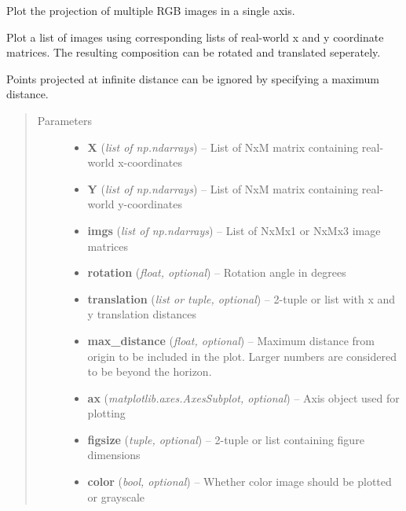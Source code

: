 \documentclass[letterpaper,10pt,english]{sphinxmanual}
\begin{document}
\begin{fulllineitems}
\label{flamingo/rectification/index:flamingo.rectification.plot.plot_rectified}
Plot the projection of multiple RGB images in a single axis.

Plot a list of images using corresponding lists of real-world
x and y coordinate matrices. The resulting composition can be
rotated and translated seperately.

Points projected at infinite distance can be ignored by
specifying a maximum distance.
\begin{quote}\begin{description}
\item[{Parameters}] \leavevmode\begin{itemize}
\item {} 
\textbf{X} (\emph{list of np.ndarrays}) -- List of NxM matrix containing real-world x-coordinates

\item {} 
\textbf{Y} (\emph{list of np.ndarrays}) -- List of NxM matrix containing real-world y-coordinates

\item {} 
\textbf{imgs} (\emph{list of np.ndarrays}) -- List of NxMx1 or NxMx3 image matrices

\item {} 
\textbf{rotation} (\emph{float, optional}) -- Rotation angle in degrees

\item {} 
\textbf{translation} (\emph{list or tuple, optional}) -- 2-tuple or list with x and y translation distances

\item {} 
\textbf{max\_distance} (\emph{float, optional}) -- Maximum distance from origin to be included in the plot.
Larger numbers are considered to be beyond the horizon.

\item {} 
\textbf{ax} (\emph{matplotlib.axes.AxesSubplot, optional}) -- Axis object used for plotting

\item {} 
\textbf{figsize} (\emph{tuple, optional}) -- 2-tuple or list containing figure dimensions

\item {} 
\textbf{color} (\emph{bool, optional}) -- Whether color image should be plotted or grayscale


\end{itemize}
\end{description}
\end{quote}
\end{fulllineitems}
\end{document}

